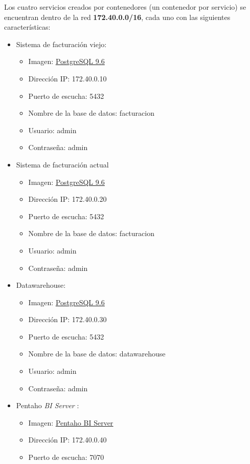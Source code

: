 Los cuatro servicios creados por contenedores (un contenedor por servicio) se encuentran dentro de la red \textbf{172.40.0.0/16}, cada uno con las siguientes características:
\begin{itemize}
    \item Sistema de facturación viejo:
        \begin{itemize}
            \item Imagen: \underline{\href{https://hub.docker.com/_/postgres/}{PostgreSQL 9.6}}
            \item Dirección IP: 172.40.0.10
            \item Puerto de escucha: 5432
            \item Nombre de la base de datos: facturacion
            \item Usuario: admin
            \item Contraseña: admin
        \end{itemize}
    \item Sistema de facturación actual
        \begin{itemize}
            \item Imagen: \underline{\href{https://hub.docker.com/_/postgres/}{PostgreSQL 9.6}}
            \item Dirección IP: 172.40.0.20
            \item Puerto de escucha: 5432
            \item Nombre de la base de datos: facturacion
            \item Usuario: admin
            \item Contraseña: admin
        \end{itemize}
    \item Datawarehouse:
        \begin{itemize}
            \item Imagen: \underline{\href{https://hub.docker.com/_/postgres/}{PostgreSQL 9.6}}
            \item Dirección IP: 172.40.0.30
            \item Puerto de escucha: 5432
            \item Nombre de la base de datos: datawarehouse
            \item Usuario: admin
            \item Contraseña: admin
        \end{itemize}
    \item Pentaho \emph{BI Server} :
        \begin{itemize}
            \item Imagen: \underline{\href{https://hub.docker.com/r/wmarinho/pentaho/}{Pentaho BI Server}}
            \item Dirección IP: 172.40.0.40
            \item Puerto de escucha: 7070
        \end{itemize}
\end{itemize}


